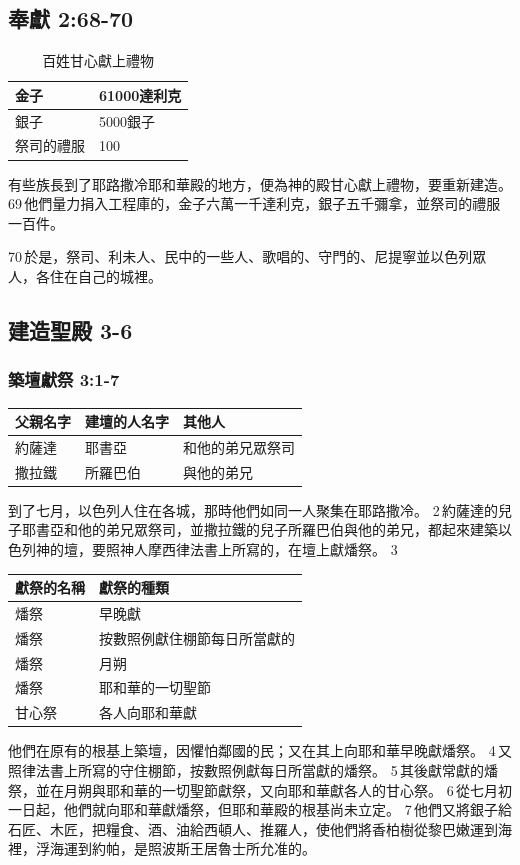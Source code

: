 \subsection{奉獻 2:68-70}
\begin{table}[H]
\centering 
\begin{tabular}{p{2cm}|p{3cm}}
\hline
\hline
金子 & 61000達利克\\\hline
銀子&5000銀子\\\hline
祭司的禮服&100\\\hline
\end{tabular}
\caption{百姓甘心獻上禮物}
\end{table}
有些族長到了耶路撒冷耶和華殿的地方，便為神的殿甘心獻上禮物，要重新建造。 69 他們量力捐入工程庫的，金子六萬一千達利克，銀子五千彌拿，並祭司的禮服一百件。

70 於是，祭司、利未人、民中的一些人、歌唱的、守門的、尼提寧並以色列眾人，各住在自己的城裡。

\subsection{建造聖殿 3-6}
\subsubsection{築壇獻祭 3:1-7}	 
\begin{table}[H]
\centering 
\begin{tabular}{p{3cm}|p{3cm}|p{4cm}}
\hline
\hline
父親名字& 建壇的人名字& 其他人\\\hline
約薩達&耶書亞&和他的弟兄眾祭司\\\hline
撒拉鐵&所羅巴伯&與他的弟兄\\\hline
\end{tabular}
\end{table}
到了七月，以色列人住在各城，那時他們如同一人聚集在耶路撒冷。 2 約薩達的兒子耶書亞和他的弟兄眾祭司，並撒拉鐵的兒子所羅巴伯與他的弟兄，都起來建築以色列神的壇，要照神人摩西律法書上所寫的，在壇上獻燔祭。 3 

\begin{table}[H]
\centering 
\begin{tabular}{|p{3cm}|p{6cm}|}
\hline
\hline
獻祭的名稱 & 獻祭的種類  \\\hline
燔祭       & 早晚獻      \\\hline
燔祭       &按數照例獻住棚節每日所當獻的\\\hline
燔祭 &月朔\\\hline
燔祭 &耶和華的一切聖節\\\hline
甘心祭 &各人向耶和華獻\\\hline
\end{tabular}
\end{table}
他們在原有的根基上築壇，因懼怕鄰國的民；又在其上向耶和華早晚獻燔祭。 4 又照律法書上所寫的守住棚節，按數照例獻每日所當獻的燔祭。 5 其後獻常獻的燔祭，並在月朔與耶和華的一切聖節獻祭，又向耶和華獻各人的甘心祭。 6 從七月初一日起，他們就向耶和華獻燔祭，但耶和華殿的根基尚未立定。 7 他們又將銀子給石匠、木匠，把糧食、酒、油給西頓人、推羅人，使他們將香柏樹從黎巴嫩運到海裡，浮海運到約帕，是照波斯王居魯士所允准的。

